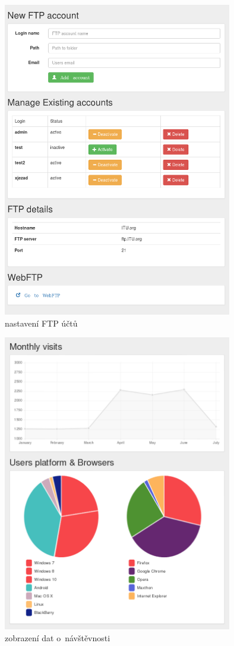 \documentclass[11pt,a4paper]{article}
\begin{document}
      \begin{figure}[ht]
        \begin{center}
          \includegraphics[width=10cm]{ftp}
          \caption{nastavení FTP účtů}
        \end{center}
      \end{figure}

      \begin{figure}[ht]
        \begin{center}
          \includegraphics[width=10cm]{graphs}
          \caption{zobrazení dat o~návštěvnosti}
        \end{center}
      \end{figure}
\end{document}
